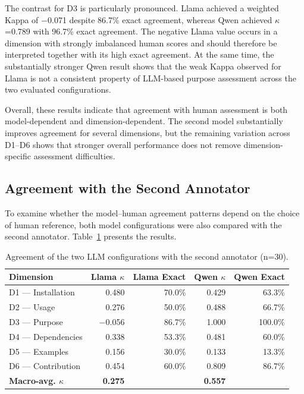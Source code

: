 The contrast for D3 is particularly pronounced. Llama achieved a
weighted Kappa of $-$0.071 despite 86.7\% exact agreement, whereas
Qwen achieved $\kappa$=0.789 with 96.7\% exact agreement. The
negative Llama value occurs in a dimension with strongly imbalanced
human scores and should therefore be interpreted together with its
high exact agreement. At the same time, the substantially stronger
Qwen result shows that the weak Kappa observed for Llama is not a
consistent property of LLM-based purpose assessment across the two
evaluated configurations.

Overall, these results indicate that agreement with human assessment
is both model-dependent and dimension-dependent. The second model
substantially improves agreement for several dimensions, but the
remaining variation across D1--D6 shows that stronger overall
performance does not remove dimension-specific assessment
difficulties.

\subsection{Agreement with the Second Annotator}

To examine whether the model--human agreement patterns depend on the
choice of human reference, both model configurations were also
compared with the second annotator. Table~\ref{tab:llm_a2} presents
the results.

\begin{table}[htbp]
\centering
\caption{Agreement of the two LLM configurations with the second
annotator (n=30).}
\label{tab:llm_a2}
\small
\begin{tabular}{lrrrr}
\hline
\textbf{Dimension}
& \textbf{Llama $\kappa$}
& \textbf{Llama Exact}
& \textbf{Qwen $\kappa$}
& \textbf{Qwen Exact} \\
\hline
D1 --- Installation & 0.480 & 70.0\% & 0.429 & 63.3\% \\
D2 --- Usage        & 0.276 & 50.0\% & 0.488 & 66.7\% \\
D3 --- Purpose      & $-$0.056 & 86.7\% & 1.000 & 100.0\% \\
D4 --- Dependencies & 0.338 & 53.3\% & 0.481 & 60.0\% \\
D5 --- Examples     & 0.156 & 30.0\% & 0.133 & 13.3\% \\
D6 --- Contribution & 0.454 & 60.0\% & 0.809 & 86.7\% \\
\hline
\textbf{Macro-avg. $\kappa$}
& \textbf{0.275} & & \textbf{0.557} & \\
\hline
\end{tabular}
\end{table}

